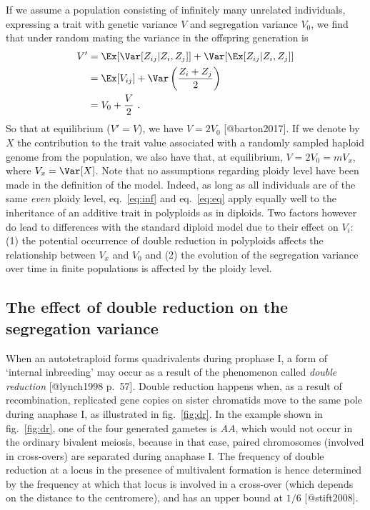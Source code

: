 If we assume a population consisting of infinitely many unrelated
individuals, expressing a trait with genetic variance \(V\) and
segregation variance \(V_0\), we find that under random mating the
variance in the offspring generation is \begin{align}
V' &= \Ex[\Var[Z_{ij}|Z_i, Z_j]] + \Var[\Ex[Z_{ij}|Z_i,Z_j]] \nonumber \\
   &= \Ex[V_{ij}] + \Var\left(\frac{Z_i + Z_j}{2}\right) \nonumber \\
   &= V_0 + \frac{V}{2}\ .
   \label{eq:eq}
\end{align} So that at equilibrium (\(V'=V\)), we have \(V = 2V_0\)
{[}@barton2017{]}. If we denote by \(X\) the contribution to the trait
value associated with a randomly sampled haploid genome from the
population, we also have that, at equilibrium, \(V=2V_0=mV_x\), where
\(V_x = \Var[X]\). Note that no assumptions regarding ploidy level have
been made in the definition of the model. Indeed, as long as all
individuals are of the same \emph{even} ploidy level, eq.~\ref{eq:inf}
and eq.~\ref{eq:eq} apply equally well to the inheritance of an additive
trait in polyploids as in diploids. Two factors however do lead to
differences with the standard diploid model due to their effect on
\(V_i\): (1) the potential occurrence of double reduction in polyploids
affects the relationship between \(V_x\) and \(V_0\) and (2) the
evolution of the segregation variance over time in finite populations is
affected by the ploidy level.

\hypertarget{the-effect-of-double-reduction-on-the-segregation-variance}{%
\subsection{The effect of double reduction on the segregation
variance}\label{the-effect-of-double-reduction-on-the-segregation-variance}}

When an autotetraploid forms quadrivalents during prophase I, a form of
`internal inbreeding' may occur as a result of the phenomenon called
\emph{double reduction} {[}@lynch1998 p.~57{]}. Double reduction happens
when, as a result of recombination, replicated gene copies on sister
chromatids move to the same pole during anaphase I, as illustrated in
fig.~\ref{fig:dr}. In the example shown in fig.~\ref{fig:dr}, one of the
four generated gametes is \(AA\), which would not occur in the ordinary
bivalent meiosis, because in that case, paired chromosomes (involved in
cross-overs) are separated during anaphase I. The frequency of double
reduction at a locus in the presence of multivalent formation is hence
determined by the frequency at which that locus is involved in a
cross-over (which depends on the distance to the centromere), and has an
upper bound at \(1/6\) {[}@stift2008{]}.

